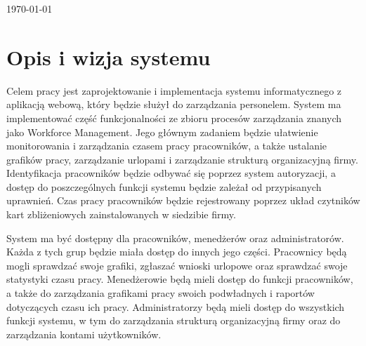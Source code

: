 \begin{titlepage}




    \vfill\vfill\vfill %

    {\large\today} %

    \vfill %

\end{titlepage}

\newpage

\tableofcontents

\newpage


\section{Opis i wizja systemu}

Celem pracy jest zaprojektowanie i implementacja systemu informatycznego z aplikacją webową, który będzie służył do zarządzania personelem. System ma implementować część funkcjonalności ze zbioru procesów zarządzania znanych jako Workforce Management. Jego głównym zadaniem będzie ułatwienie monitorowania i zarządzania czasem pracy pracowników, a także ustalanie grafików pracy, zarządzanie urlopami i zarządzanie strukturą organizacyjną firmy. Identyfikacja pracowników będzie odbywać się poprzez system autoryzacji, a dostęp do poszczególnych funkcji systemu będzie zależał od przypisanych uprawnień. Czas pracy pracowników będzie rejestrowany poprzez układ czytników kart zbliżeniowych zainstalowanych w siedzibie firmy.

System ma być dostępny dla pracowników, menedżerów oraz administratorów. Każda z tych grup będzie miała dostęp do innych jego części. Pracownicy będą mogli sprawdzać swoje grafiki, zgłaszać wnioski urlopowe oraz sprawdzać swoje statystyki czasu pracy. Menedżerowie będą mieli dostęp do funkcji pracowników, a także do zarządzania grafikami pracy swoich podwładnych i raportów dotyczących czasu ich pracy. Administratorzy będą mieli dostęp do wszystkich funkcji systemu, w tym do zarządzania strukturą organizacyjną firmy oraz do zarządzania kontami użytkowników.

